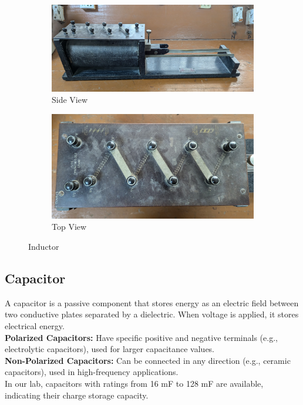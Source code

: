 \documentclass[a4paper,12pt]{article}
\begin{document}
	
	\begin{figure}[H]
		\centering
		\begin{subfigure}[t]{0.49\textwidth}
			\centering
			\includegraphics[width=1\linewidth]{Images/10}
			\caption{Side View}
		\end{subfigure}
		\hfill
		\begin{subfigure}[t]{0.49\textwidth}
			\centering
			\includegraphics[width=1\linewidth]{Images/11}
			\caption{Top View}
		\end{subfigure}
	
		\caption{Inductor }
		\label{fig:5}
	\end{figure}
	
	
\subsection{Capacitor}
A capacitor is a passive component that stores energy as an electric field between two conductive plates separated by a dielectric. When voltage is applied, it stores electrical energy.\\
	 \textbf{Polarized Capacitors:} Have specific positive and negative terminals (e.g., electrolytic capacitors), used for larger capacitance values.\\
	 \textbf{Non-Polarized Capacitors:} Can be connected in any direction (e.g., ceramic capacitors), used in high-frequency applications.\\
 In our lab, capacitors with ratings from 16 mF to 128 mF are available, indicating their charge storage capacity.
\end{document}
